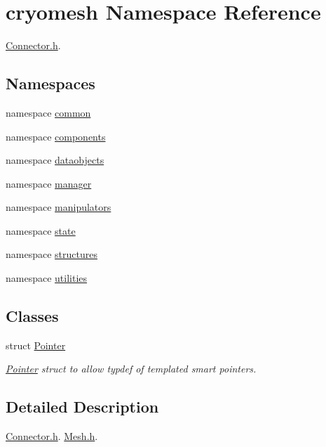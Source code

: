 \hypertarget{namespacecryomesh}{\section{cryomesh \-Namespace \-Reference}
\label{namespacecryomesh}
}


\hyperlink{Connector_8h}{\-Connector.\-h}.  


\subsection*{\-Namespaces}
\begin{DoxyCompactItemize}
\item 
namespace \hyperlink{namespacecryomesh_1_1common}{common}
\item 
namespace \hyperlink{namespacecryomesh_1_1components}{components}
\item 
namespace \hyperlink{namespacecryomesh_1_1dataobjects}{dataobjects}
\item 
namespace \hyperlink{namespacecryomesh_1_1manager}{manager}
\item 
namespace \hyperlink{namespacecryomesh_1_1manipulators}{manipulators}
\item 
namespace \hyperlink{namespacecryomesh_1_1state}{state}
\item 
namespace \hyperlink{namespacecryomesh_1_1structures}{structures}
\item 
namespace \hyperlink{namespacecryomesh_1_1utilities}{utilities}
\end{DoxyCompactItemize}
\subsection*{\-Classes}
\begin{DoxyCompactItemize}
\item 
struct \hyperlink{structcryomesh_1_1Pointer}{\-Pointer}
\begin{DoxyCompactList}\small\item\em \hyperlink{structcryomesh_1_1Pointer}{\-Pointer} struct to allow typdef of templated smart pointers. \end{DoxyCompactList}\end{DoxyCompactItemize}


\subsection{\-Detailed \-Description}
\hyperlink{Connector_8h}{\-Connector.\-h}. \hyperlink{Mesh_8h}{\-Mesh.\-h}.

